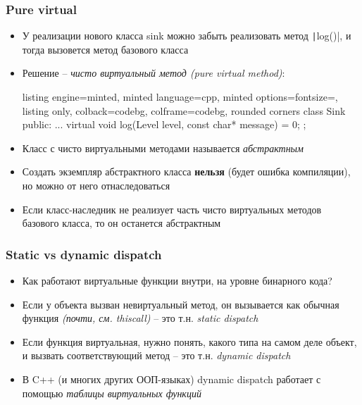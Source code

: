 \documentclass[10pt]{beamer}
\begin{document}
\begin{frame}[fragile]
\frametitle{Pure virtual}
\begin{itemize}
\item У реализации нового класса sink можно забыть реализовать метод \texttt|log()|, и тогда вызовется метод базового класса
\pause
\item Решение -- \textit{чисто виртуальный метод (pure virtual method)}:
\begin{tcblisting}{listing engine=minted, minted language=cpp, minted options={fontsize=\scriptsize}, listing only, colback=codebg, colframe=codebg, rounded corners}
class Sink {
public:
  ...
  virtual void log(Level level, const char* message) = 0;
};
\end{tcblisting}
\pause
\item Класс с чисто виртуальными методами называется \textit{абстрактным}
\pause
\item Создать экземпляр абстрактного класса \textbf{нельзя} (будет ошибка компиляции), но можно от него отнаследоваться
\pause
\item Если класс-наследник не реализует часть чисто виртуальных методов базового класса, то он останется абстрактным
\end{itemize}
\end{frame}

\begin{frame}[fragile]
\frametitle{Static vs dynamic dispatch}
\begin{itemize}
\item Как работают виртуальные функции внутри, на уровне бинарного кода?
\pause
\item Если у объекта вызван невиртуальный метод, он вызывается как обычная функция \textit{(почти, см. thiscall)} -- это т.н. \textit{static dispatch}
\pause
\item Если функция виртуальная, нужно понять, какого типа на самом деле объект, и вызвать соответствующий метод -- это т.н. \textit{dynamic dispatch}
\pause
\item В C++ (и многих других ООП-языках) dynamic dispatch работает с помощью \textit{таблицы виртуальных функций}
\end{itemize}
\end{frame}
\end{document}
